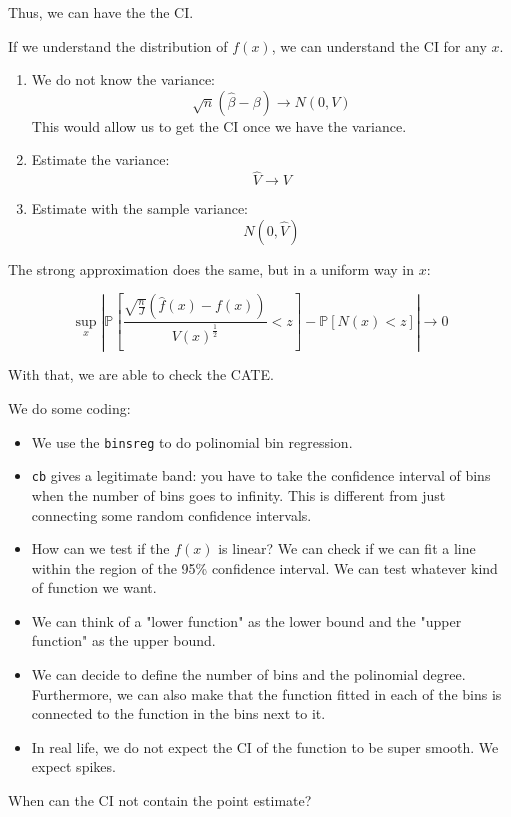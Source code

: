 \documentclass{article}
\begin{document}
Thus, we can have the the CI.

If we understand the distribution of $f(x)$, we can understand the CI for any $x$.

\begin{enumerate}
    \item We do not know the variance:
    $$
    \sqrt{n} \left( \hat{\beta} - \beta \right) \to N(0, V)
    $$
    This would allow us to get the CI once we have the variance.
    \item Estimate the variance:
    $$
    \hat{V} \to V
    $$
    \item Estimate with the sample variance:
    $$
    N (0, \hat{V})
    $$
\end{enumerate}

The strong approximation does the same, but in a uniform way in $x$:

$$
\sup_x \left|
    \mathbb{P} \left[
        \frac{\sqrt{\frac{n}{J}} (\hat{f}(x) - f(x))}{V(x)^{\frac{1}{2}}}
        < z
    \right]
    - \mathbb{P} \left[
        N(x) < z
    \right]
\right| \to 0
$$

With that, we are able to check the CATE.

We do some coding:
\begin{itemize}
    \item We use the \texttt{binsreg} to do polinomial bin regression.
    \item \texttt{cb} gives a legitimate band: you have to take the confidence interval of bins when the number of bins goes to infinity. This is different from just connecting some random confidence intervals.
    \item How can we test if the $f(x)$ is linear? We can check if we can fit a line within the region of the 95\% confidence interval. We can test whatever kind of function we want.
    \item We can think of a "lower function" as the lower bound and the "upper function" as the upper bound.
    \item We can decide to define the number of bins and the polinomial degree. Furthermore, we can also make that the function fitted in each of the bins is connected to the function in the bins next to it.
    \item In real life, we do not expect the CI of the function to be super smooth. We expect spikes.
\end{itemize}

When can the CI not contain the point estimate?
\end{document}

